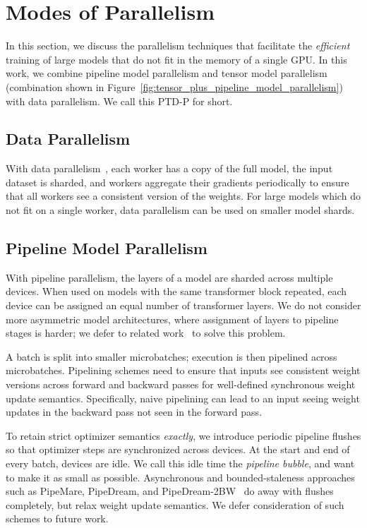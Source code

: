 \section{Modes of Parallelism}
\label{sec:model_parallelism}

In this section, we discuss the parallelism techniques that facilitate the \emph{efficient} training of large models that do not fit in the memory of a single GPU. In this work, we combine pipeline model parallelism and tensor model parallelism (combination shown in Figure~\ref{fig:tensor_plus_pipeline_model_parallelism}) with data parallelism. We call this PTD-P for short.

\subsection{Data Parallelism}

With data parallelism~\cite{xing2015petuum, pytorchdistributed}, each worker has a copy of the full model, the input dataset is sharded, and workers aggregate their gradients periodically to ensure that all workers see a consistent version of the weights. For large models which do not fit on a single worker, data parallelism can be used on smaller model shards.

\subsection{Pipeline Model Parallelism}

With pipeline parallelism, the layers of a model are sharded across multiple devices. When used on models with the same transformer block repeated, each device can be assigned an equal number of transformer layers. We do not consider more asymmetric model architectures, where assignment of layers to pipeline stages is harder; we defer to related work~\cite{narayanan2019pipedream, flexflow, tarnawski2020efficient} to solve this problem.

A batch is split into smaller microbatches; execution is then pipelined across microbatches. Pipelining schemes need to ensure that inputs see consistent weight versions across forward and backward passes for well-defined synchronous weight update semantics. Specifically, naive pipelining can lead to an input seeing weight updates in the backward pass not seen in the forward pass.

To retain strict optimizer semantics \emph{exactly}, we introduce periodic pipeline flushes so that optimizer steps are synchronized across devices. At the start and end of every batch, devices are idle. We call this idle time the \emph{pipeline bubble}, and want to make it as small as possible. Asynchronous and bounded-staleness approaches such as PipeMare, PipeDream, and PipeDream-2BW~\cite{yang2021pipemare, pb2021kosson, narayanan2019pipedream, narayanan2021memory} do away with flushes completely, but relax weight update semantics. We defer consideration of such schemes to future work.

